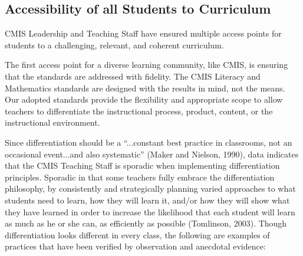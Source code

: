 \documentclass{report}
\begin{document}
\subsection{Accessibility of all Students to Curriculum}



\begin{findings}
CMIS Leadership and Teaching Staff have ensured multiple access points for students to a challenging, relevant, and coherent curriculum. 


The first access point for a diverse learning community, like CMIS, is ensuring that the standards are addressed with fidelity. The CMIS Literacy and Mathematics standards are designed with the results in mind, not the means. Our adopted standards provide the flexibility and appropriate scope to allow teachers to differentiate the instructional process, product, content, or the instructional environment. 

Since differentiation should be a “...constant best practice in classrooms, not an occasional event...and also systematic” (Maker and Nielson, 1990), data indicates that the CMIS Teaching Staff is sporadic when implementing differentiation principles. Sporadic in that some teachers fully embrace the differentiation philosophy, by consistently and strategically planning varied approaches to what students need to learn, how they will learn it, and/or how they will show what they have learned in order to increase the likelihood that each student will learn as much as he or she can, as efficiently as possible (Tomlinson, 2003). Though differentiation looks different in every class, the following are examples of practices that have been verified by observation and anecdotal evidence:
 

\end{findings}
\end{document}

